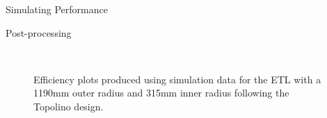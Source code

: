 \begin{section}{Simulating Performance}
\begin{subsection}{Post-processing}
\begin{figure}[htb]
\begin{center}
\quad
{}\\
\quad
{}
\end{center}
\caption{Efficiency plots produced using simulation data for the ETL with a 1190mm outer radius and 315mm inner radius following the Topolino design.}
\label{fig:chronoplots}
\end{figure}

\end{subsection}
\end{section}